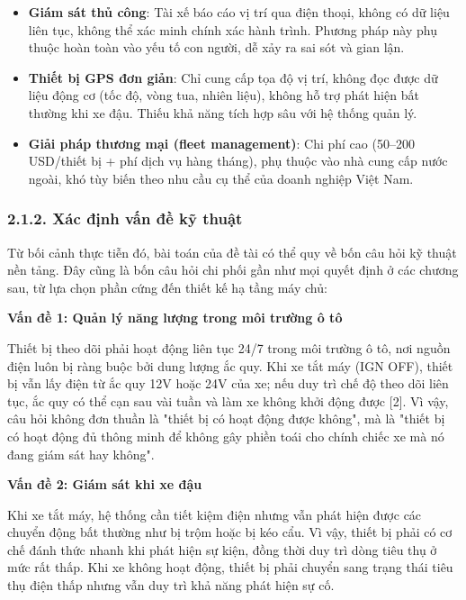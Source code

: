 \documentclass[a4paper]{extarticle}
\providecommand{\tightlist}{%
  \setlength{\itemsep}{0pt}\setlength{\parskip}{0pt}}
\begin{document}
\begin{itemize}
\tightlist
\item
  \textbf{Giám sát thủ công}: Tài xế báo cáo vị trí qua điện thoại,
  không có dữ liệu liên tục, không thể xác minh chính xác hành trình.
  Phương pháp này phụ thuộc hoàn toàn vào yếu tố con người, dễ xảy ra
  sai sót và gian lận.
\item
  \textbf{Thiết bị GPS đơn giản}: Chỉ cung cấp tọa độ vị trí, không đọc
  được dữ liệu động cơ (tốc độ, vòng tua, nhiên liệu), không hỗ trợ phát
  hiện bất thường khi xe đậu. Thiếu khả năng tích hợp sâu với hệ thống
  quản lý.
\item
  \textbf{Giải pháp thương mại (fleet management)}: Chi phí cao (50--200
  USD/thiết bị + phí dịch vụ hàng tháng), phụ thuộc vào nhà cung cấp
  nước ngoài, khó tùy biến theo nhu cầu cụ thể của doanh nghiệp Việt
  Nam.
\end{itemize}

\subsubsection{2.1.2. Xác định vấn đề kỹ
thuật}\label{212-xuxe1c-ux111ux1ecbnh-vux1ea5n-ux111ux1ec1-kux1ef9-thuux1eadt}

Từ bối cảnh thực tiễn đó, bài toán của đề tài có thể quy về bốn câu hỏi
kỹ thuật nền tảng. Đây cũng là bốn câu hỏi chi phối gần như mọi quyết
định ở các chương sau, từ lựa chọn phần cứng đến thiết kế hạ tầng máy
chủ:

\textbf{Vấn đề 1: Quản lý năng lượng trong môi trường ô tô}

Thiết bị theo dõi phải hoạt động liên tục 24/7 trong môi trường ô tô,
nơi nguồn điện luôn bị ràng buộc bởi dung lượng ắc quy. Khi xe tắt máy
(IGN OFF), thiết bị vẫn lấy điện từ ắc quy 12V hoặc 24V của xe; nếu duy
trì chế độ theo dõi liên tục, ắc quy có thể cạn sau vài tuần và làm xe
không khởi động được {[}2{]}. Vì vậy, câu hỏi không đơn thuần là "thiết
bị có hoạt động được không", mà là "thiết bị có hoạt động đủ thông minh
để không gây phiền toái cho chính chiếc xe mà nó đang giám sát hay
không".

\textbf{Vấn đề 2: Giám sát khi xe đậu}

Khi xe tắt máy, hệ thống cần tiết kiệm điện nhưng vẫn phát hiện được các
chuyển động bất thường như bị trộm hoặc bị kéo cẩu. Vì vậy, thiết bị
phải có cơ chế đánh thức nhanh khi phát hiện sự kiện, đồng thời duy trì
dòng tiêu thụ ở mức rất thấp. Khi xe không hoạt động, thiết bị phải
chuyển sang trạng thái tiêu thụ điện thấp nhưng vẫn duy trì khả năng
phát hiện sự cố.
\end{document}
